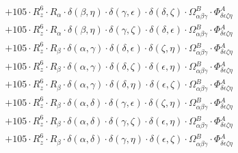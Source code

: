 \documentclass{article}
\begin{document}
\begin{equation}
\begin{array}{c}
 \\[0.2em] 		 + 105 \cdot R_{z}^{6} \cdot R_{\alpha{}} \cdot \delta{}\left(\beta{}, \eta{}\right) \cdot \delta{}\left(\gamma{}, \epsilon{}\right) \cdot \delta{}\left(\delta{}, \zeta{}\right) \cdot \Omega{}^{B}_{\alpha{}\beta{}\gamma{}} \cdot \Phi{}^{A}_{\delta{}\epsilon{}\zeta{}\eta{}} 
 \\[0.2em] 		 + 105 \cdot R_{z}^{6} \cdot R_{\alpha{}} \cdot \delta{}\left(\beta{}, \eta{}\right) \cdot \delta{}\left(\gamma{}, \zeta{}\right) \cdot \delta{}\left(\delta{}, \epsilon{}\right) \cdot \Omega{}^{B}_{\alpha{}\beta{}\gamma{}} \cdot \Phi{}^{A}_{\delta{}\epsilon{}\zeta{}\eta{}} 
 \\[0.2em] 		 + 105 \cdot R_{z}^{6} \cdot R_{\beta{}} \cdot \delta{}\left(\alpha{}, \gamma{}\right) \cdot \delta{}\left(\delta{}, \epsilon{}\right) \cdot \delta{}\left(\zeta{}, \eta{}\right) \cdot \Omega{}^{B}_{\alpha{}\beta{}\gamma{}} \cdot \Phi{}^{A}_{\delta{}\epsilon{}\zeta{}\eta{}} 
 \\[0.2em] 		 + 105 \cdot R_{z}^{6} \cdot R_{\beta{}} \cdot \delta{}\left(\alpha{}, \gamma{}\right) \cdot \delta{}\left(\delta{}, \zeta{}\right) \cdot \delta{}\left(\epsilon{}, \eta{}\right) \cdot \Omega{}^{B}_{\alpha{}\beta{}\gamma{}} \cdot \Phi{}^{A}_{\delta{}\epsilon{}\zeta{}\eta{}} 
 \\[0.2em] 		 + 105 \cdot R_{z}^{6} \cdot R_{\beta{}} \cdot \delta{}\left(\alpha{}, \gamma{}\right) \cdot \delta{}\left(\delta{}, \eta{}\right) \cdot \delta{}\left(\epsilon{}, \zeta{}\right) \cdot \Omega{}^{B}_{\alpha{}\beta{}\gamma{}} \cdot \Phi{}^{A}_{\delta{}\epsilon{}\zeta{}\eta{}} 
 \\[0.2em] 		 + 105 \cdot R_{z}^{6} \cdot R_{\beta{}} \cdot \delta{}\left(\alpha{}, \delta{}\right) \cdot \delta{}\left(\gamma{}, \epsilon{}\right) \cdot \delta{}\left(\zeta{}, \eta{}\right) \cdot \Omega{}^{B}_{\alpha{}\beta{}\gamma{}} \cdot \Phi{}^{A}_{\delta{}\epsilon{}\zeta{}\eta{}} 
 \\[0.2em] 		 + 105 \cdot R_{z}^{6} \cdot R_{\beta{}} \cdot \delta{}\left(\alpha{}, \delta{}\right) \cdot \delta{}\left(\gamma{}, \zeta{}\right) \cdot \delta{}\left(\epsilon{}, \eta{}\right) \cdot \Omega{}^{B}_{\alpha{}\beta{}\gamma{}} \cdot \Phi{}^{A}_{\delta{}\epsilon{}\zeta{}\eta{}} 
 \\[0.2em] 		 + 105 \cdot R_{z}^{6} \cdot R_{\beta{}} \cdot \delta{}\left(\alpha{}, \delta{}\right) \cdot \delta{}\left(\gamma{}, \eta{}\right) \cdot \delta{}\left(\epsilon{}, \zeta{}\right) \cdot \Omega{}^{B}_{\alpha{}\beta{}\gamma{}} \cdot \Phi{}^{A}_{\delta{}\epsilon{}\zeta{}\eta{}} 

\end{array}
\end{equation}
\end{document}
